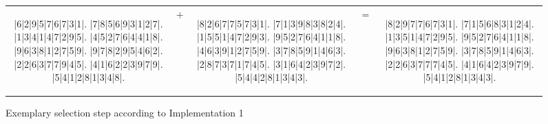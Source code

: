 \begin{figure}[h]
  \centering
  {\setlength{\tabcolsep}{-9pt}
  \renewcommand{\arraystretch}{1.5}
   \begin{tabular}{c c c c c}
    \begin{adjustbox}{width=0.38\textwidth,valign=c}
      \begin{minipage}{\linewidth}
        \begin{sudoku}
        |6|2|9|5|7|6|7|3|1|.
        |7|8|5|6|9|3|1|2|7|.
        |1|3|4|1|4|7|2|9|5|.
        |4|5|2|7|6|4|4|1|8|.
        |9|6|3|8|1|2|7|5|9|.
        |9|7|8|2|9|5|4|6|2|.
        |2|2|6|3|7|7|9|4|5|.
        |4|1|6|2|2|3|9|7|9|.
        |5|4|1|2|8|1|3|4|8|.
        \end{sudoku}
      \end{minipage}
    \end{adjustbox}
    & %
    {\begin{adjustbox}{valign=c}\Large$+$\end{adjustbox}}
    &
    \begin{adjustbox}{width=0.38\textwidth,valign=c}
      \begin{minipage}{\linewidth}
        \begin{sudoku}
        |8|2|6|7|7|5|7|3|1|.
        |7|1|3|9|8|3|8|2|4|.
        |1|5|5|1|4|7|2|9|3|.
        |9|5|2|7|6|4|1|1|8|.
        |4|6|3|9|1|2|7|5|9|.
        |3|7|8|5|9|1|4|6|3|.
        |2|8|7|3|7|1|7|4|5|.
        |3|1|6|4|2|3|9|7|2|.
        |5|4|4|2|8|1|3|4|3|.
        \end{sudoku}
      \end{minipage}
    \end{adjustbox}
    & %
    {\begin{adjustbox}{valign=c}\Large$=$\end{adjustbox}}
    &
    \begin{adjustbox}{width=0.38\textwidth,valign=c}
      \begin{minipage}{\linewidth}
        \begin{sudoku}
        |8|2|9|7|7|6|7|3|1|.
        |7|1|5|6|8|3|1|2|4|.
        |1|3|5|1|4|7|2|9|5|.
        |9|5|2|7|6|4|1|1|8|.
        |9|6|3|8|1|2|7|5|9|.
        |3|7|8|5|9|1|4|6|3|.
        |2|2|6|3|7|7|7|4|5|.
        |4|1|6|4|2|3|9|7|9|.
        |5|4|1|2|8|1|3|4|3|.
        \end{sudoku}
      \end{minipage}
    \end{adjustbox}
   \end{tabular}
  }
  \caption{Exemplary selection step according to Implementation 1}
  \label{fig:impl-1-selection}
\end{figure}

